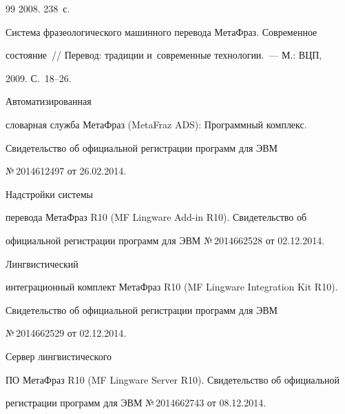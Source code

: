 {{\begin{thebibliography}{99}
2008. 238~с.









Система фразеологического машинного перевода МетаФраз. Современное 


состояние~/\!\!/ Перевод: традиции и~современные технологии.~--- М.: ВЦП, 


2009. С.~18--26.




 Автоматизированная 


словарная служба МетаФраз (MetaFraz ADS): Программный комплекс. 


Свидетельство об официальной регистрации программ для ЭВМ 


№\,2014612497 от 26.02.2014.







 Надстройки системы 


перевода МетаФраз R10 (MF Lingware Add-in R10). Свидетельство об 


официальной регистрации программ для ЭВМ №\,2014662528 от 02.12.2014.













 Лингвистический 


интеграционный комплект МетаФраз R10 (MF Lingware Integration Kit R10). 


Свидетельство об официальной регистрации программ для ЭВМ 


№\,2014662529 от 02.12.2014.




 Сервер лингвистического 


ПО \mbox{МетаФраз} R10 (MF Lingware Server R10). Свидетельство об официальной 


регистрации программ для ЭВМ №\,2014662743 от 08.12.2014.






\end{thebibliography}}}
